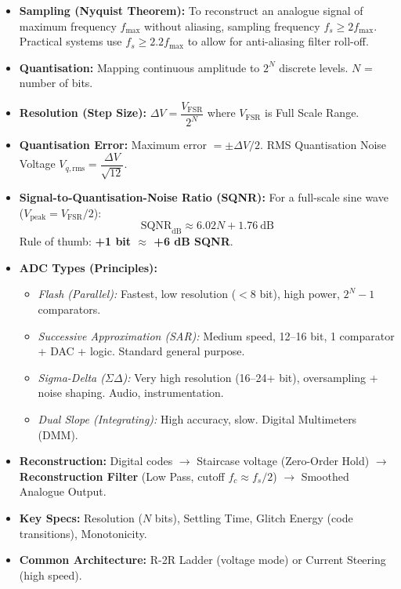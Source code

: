 \documentclass[11pt]{article}
\begin{document}
\begin{propriete}
\begin{itemize}
\item \textbf{Sampling (Nyquist Theorem):} To reconstruct an analogue signal of maximum frequency $f_{\max}$ without aliasing, sampling frequency $f_s \ge 2 f_{\max}$. Practical systems use $f_s \ge 2.2 f_{\max}$ to allow for anti-aliasing filter roll-off.
\item \textbf{Quantisation:} Mapping continuous amplitude to $2^N$ discrete levels. $N$ = number of bits.
\item \textbf{Resolution (Step Size):} $\Delta V = \dfrac{V_{\mathrm{FSR}}}{2^N}$ where $V_{\mathrm{FSR}}$ is Full Scale Range.
\item \textbf{Quantisation Error:} Maximum error $= \pm \Delta V / 2$. RMS Quantisation Noise Voltage $V_{q,\mathrm{rms}} = \dfrac{\Delta V}{\sqrt{12}}$.
\item \textbf{Signal-to-Quantisation-Noise Ratio (SQNR):} For a full-scale sine wave ($V_{\mathrm{peak}} = V_{\mathrm{FSR}}/2$):
\[
\mathrm{SQNR}_{\mathrm{dB}} \approx 6.02 N + 1.76\ \mathrm{dB}
\]
Rule of thumb: \textbf{+1 bit $\approx$ +6 dB SQNR}.
\item \textbf{ADC Types (Principles):}
\begin{itemize}
\item \emph{Flash (Parallel):} Fastest, low resolution ($<8$ bit), high power, $2^N-1$ comparators.
\item \emph{Successive Approximation (SAR):} Medium speed, 12--16 bit, 1 comparator + DAC + logic. Standard general purpose.
\item \emph{Sigma-Delta ($\Sigma\Delta$):} Very high resolution (16--24+ bit), oversampling + noise shaping. Audio, instrumentation.
\item \emph{Dual Slope (Integrating):} High accuracy, slow. Digital Multimeters (DMM).
\end{itemize}
\end{itemize}
\end{propriete}

\begin{propriete}
\begin{itemize}
\item \textbf{Reconstruction:} Digital codes $\to$ Staircase voltage (Zero-Order Hold) $\to$ \textbf{Reconstruction Filter} (Low Pass, cutoff $f_c \approx f_s/2$) $\to$ Smoothed Analogue Output.
\item \textbf{Key Specs:} Resolution ($N$ bits), Settling Time, Glitch Energy (code transitions), Monotonicity.
\item \textbf{Common Architecture:} R-2R Ladder (voltage mode) or Current Steering (high speed).
\end{itemize}
\end{propriete}
\end{document}
